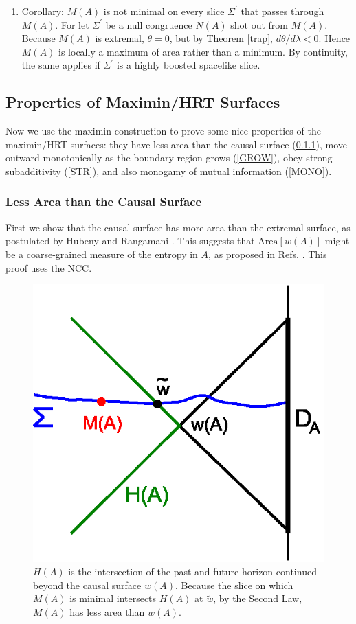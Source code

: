 \documentclass[12pt]{article}
\begin{document}
\begin{enumerate}[resume]
\begin{enumerate}
	\item Corollary: $M(A)$ is not minimal on every slice $\Sigma^\prime$ that passes through $M(A)$.  For let $\Sigma^\prime$ be a null congruence $N(A)$ shot out from $M(A)$.  Because $M(A)$ is extremal, $\theta = 0$, but by Theorem \ref{trap}, 
$d \theta / d \lambda < 0$.  Hence $M(A)$ is locally a maximum of area rather than a minimum.  By continuity, the same applies if $\Sigma^\prime$ is a highly boosted spacelike slice.
%
	\end{enumerate}
\end{enumerate}

\subsection{Properties of Maximin/HRT Surfaces}\label{props}

Now we use the maximin construction to prove some nice properties of the maximin/HRT surfaces: they have less area than the causal surface (\ref{LESS}), move outward monotonically as the boundary region grows (\ref{GROW}), obey strong subadditivity (\ref{STR}), and also monogamy of mutual information (\ref{MONO}).

\subsubsection{Less Area than the Causal Surface}\label{LESS}

First we show that the causal surface has more area than the extremal surface, as postulated by Hubeny and Rangamani \cite{HR12}.  This suggests that $\mathrm{Area}[w(A)]$ might be a coarse-grained measure of the entropy in $A$, as proposed in Refs. \cite{HR12,coarse}.  This proof uses the NCC.
\begin{figure}[hbt]
\centering
\includegraphics[width=.4\textwidth]{lesser.eps}
\caption{\footnotesize $H(A)$ is the intersection of the past and future horizon continued beyond the causal surface $w(A)$.  Because the slice on which $M(A)$ is minimal intersects $H(A)$ at $\tilde{w}$, by the Second Law, $M(A)$ has less area than $w(A)$.}\label{lesser}
\end{figure}
\end{document}
